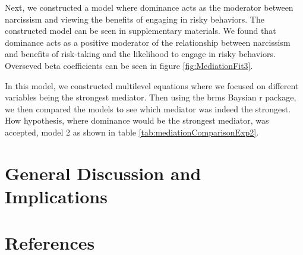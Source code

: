 \documentclass[
  donotrepeattitle,doc, 12pt, a4paper,floatsintext]{apa7}
\begin{document}
Next, we constructed a model where dominance acts as the moderator between narcissism and viewing the benefits of engaging in risky behaviors. The constructed model can be seen in supplementary materials. We found that dominance acts as a positive moderator of the relationship between narcissism and benefits of risk-taking and the likelihood to engage in risky behaviors. Overseved beta coefficients can be seen in figure \ref{fig:MediationFit3}.

In this model, we constructed multilevel equations where we focused on different variables being the strongest mediator. Then using the brms Baysian r package, we then compared the models to see which mediator was indeed the strongest. How hypothesis, where dominance would be the strongest mediator, was accepted, model 2 as shown in table \ref{tab:mediationComparisonExp2}.

\hypertarget{general-discussion-and-implications}{%
\section{General Discussion and Implications}\label{general-discussion-and-implications}}

\newpage
\newpage

\hypertarget{references}{%
\section{References}\label{references}}

\begingroup
\end{document}
